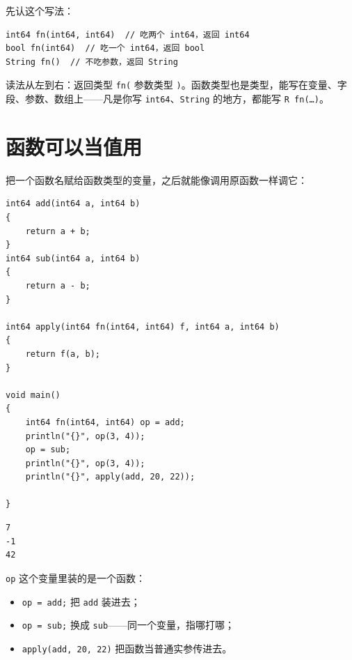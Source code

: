 先认这个写法：

\par
\medskip
\begin{lstlisting}[style=chali]
int64 fn(int64, int64)  // 吃两个 int64，返回 int64
bool fn(int64)  // 吃一个 int64，返回 bool
String fn()  // 不吃参数，返回 String
\end{lstlisting}
\par
\medskip

读法从左到右：返回类型 \texttt{fn(\allowbreak{}} 参数类型 \texttt{)\allowbreak{}}。函数类型也是类型，能写在变量、字段、参数、数组上——凡是你写 \texttt{int64}、\texttt{String} 的地方，都能写 \texttt{R fn(\allowbreak{}…)\allowbreak{}}。

\section{函数可以当值用}

把一个函数名赋给函数类型的变量，之后就能像调用原函数一样调它：

\par
\medskip
\begin{lstlisting}[style=chali]
int64 add(int64 a, int64 b)
{
    return a + b;
}
int64 sub(int64 a, int64 b)
{
    return a - b;
}

int64 apply(int64 fn(int64, int64) f, int64 a, int64 b)
{
    return f(a, b);
}

void main()
{
    int64 fn(int64, int64) op = add;
    println("{}", op(3, 4));
    op = sub;
    println("{}", op(3, 4));
    println("{}", apply(add, 20, 22));

}
\end{lstlisting}
\par
\medskip

\par
\medskip
\begin{lstlisting}[style=out]
7
-1
42
\end{lstlisting}
\par
\medskip

\texttt{op} 这个变量里装的是一个函数：

\begin{itemize}

\item \texttt{op =\allowbreak{} add;} 把 \texttt{add} 装进去；

\item \texttt{op =\allowbreak{} sub;} 换成 \texttt{sub}——同一个变量，指哪打哪；

\item \texttt{apply(\allowbreak{}add,\allowbreak{} 20,\allowbreak{} 22)\allowbreak{}} 把函数当普通实参传进去。

\end{itemize}

